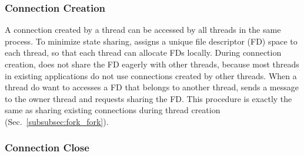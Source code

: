 \subsubsection{Connection Creation}
\label{subsubsec:fork_new}

A connection created by a thread can be accessed by all threads in the same process. To minimize state sharing, \libipc assigns a unique file descriptor (FD) space to each thread, so that each thread can allocate FDs locally. 
During connection creation, \libipc does not share the FD eagerly with other threads, because most threads in existing applications do not use connections created by other threads.
When a thread do want to accesses a FD that belongs to another thread, \libipc sends a message to the owner thread and requests sharing the FD. This procedure is exactly the same as sharing existing connections during thread creation (Sec.~\ref{subsubsec:fork_fork}). %

\subsubsection{Connection Close}
\label{subsubsec:fork_close}



